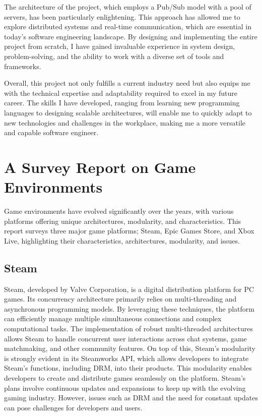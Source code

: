 \documentclass[]{final}
\begin{document}
The architecture of the project, which employs a Pub/Sub model with a pool
of servers, has been particularly enlightening. This approach has allowed
me to explore distributed systems and real-time communication, which are
essential in today’s software engineering landscape. By designing and
implementing the entire project from scratch, I have gained invaluable
experience in system design, problem-solving, and the ability to work with
a diverse set of tools and frameworks.

Overall, this project not only fulfills a current industry need but also equips
me with the technical expertise and adaptability required to excel in my future
career. The skills I have developed, ranging from learning new programming
languages to designing scalable architectures, will enable me to quickly
adapt to new technologies and challenges in the workplace, making me a
more versatile and capable software engineer.

\chapter{A Survey Report on Game Environments}

Game environments have evolved significantly over the years, with various platforms
offering unique architectures, modularity, and characteristics. This report surveys
three major game platforms; Steam, Epic Games Store, and Xbox Live, highlighting
their characteristics, architectures, modularity, and issues.

\section{Steam}
Steam, developed by Valve Corporation, is a digital distribution platform
for PC games. Its concurrency architecture primarily relies on multi-threading and asynchronous
programming models. By leveraging these techniques, the platform can efficiently manage
multiple simultaneous connections and complex computational tasks. The implementation
of robust multi-threaded architectures allows Steam to handle concurrent user interactions
across chat systems, game matchmaking, and other community features. On top of this,
Steam's modularity is strongly evident in its Steamworks API, which allows developers to
integrate Steam's functions, including DRM, into their products.\cite{simmons_decoding_2023, noauthor_steamworks_nodate}
This modularity enables developers to create and distribute games seamlessly on the platform.
Steam's plans involve continuous updates and expansions to keep up with
the evolving gaming industry.\cite{noauthor_steam_nodate1} However, issues such as DRM and the need for
constant updates can pose challenges for developers and users\cite{noauthor_steam_nodate}.
\end{document}
